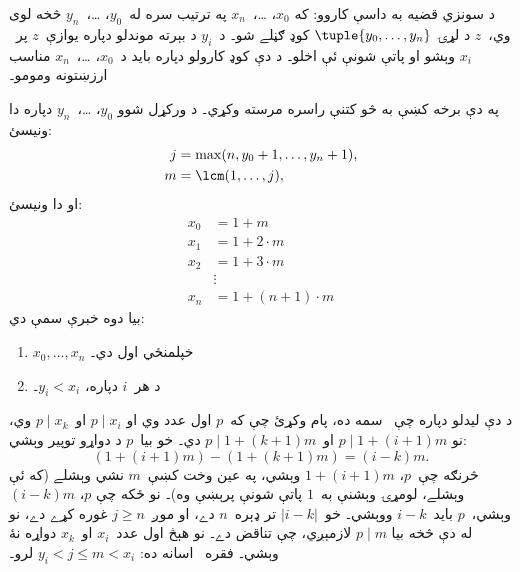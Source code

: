 \documentclass[../../../include/open-logic-section]{subfiles}
\begin{document}
د سونزي قضيه به داسې کاروو: که $x_0$، \dots،~$x_n$ په ترتيب سره
له~$y_0$، \dots،~$y_n$ څخه لوی وي،~$z$ د لړۍ
$\tuple{y_0, \dots,y_n}$ کوډ ګڼلے شو۔ د~$y_i$ د بېرته موندلو
دپاره يوازې~$z$ پر~$x_i$ وېشو او پاتې شونې ئې اخلو۔ د دې کوډ کارولو
دپاره بايد د~$x_0$، \dots،~$x_n$ مناسب ارزښتونه ومومو۔

په دې برخه کښې به څو کتنې راسره مرسته وکړي۔ د ورکړل شوو
$y_0$، \dots،~$y_n$ دپاره دا ونيسئ:
\begin{align*}
j &= \max(n, y_0 + 1, \dots, y_n + 1), \\
m &= \lcm(1,\dots,j),
\end{align*}
او دا ونيسئ:
\begin{align*}
x_0 & = 1 + m \\
x_1 & = 1 + 2 \cdot m \\
x_2 & = 1 + 3 \cdot m \\
& \vdots  \\
x_n & = 1 + (n+1) \cdot m
\end{align*}
بيا دوه خبرې سمې دي:
\begin{enumerate}
\item{} $x_0,\dots,x_n$ خپلمنځي اول دي۔
\item{} د هر~$i$ دپاره، $y_i < x_i$۔
\end{enumerate}
د دې ليدلو دپاره چې~ سمه ده، پام وکړئ چې که~$p$
اول عدد وي او $p \mid x_i$ او~$p \mid x_k$ وي، نو
$p \mid 1 + (i+1) m$ او~$p \mid 1 + (k+1) m$ دي۔ خو بيا~$p$ د
دواړو توپير وېشي:
\[
(1 + (i+1)m) - (1+ (k+1)m) = (i-k) m.
\]
څرنګه چې~$p$، $1 + (i+1)m$ وېشي، په عين وخت کښې~$m$ نشي وېشلے
(که ئې وېشلے، لومړۍ وېشنې به~$1$ پاتې شونې پرېښې وه)۔ نو ځکه چې
$p$، $(i-k)m$ وېشي،~$p$ بايد~$i-k$ ووېشي۔ خو~$\left|i-k\right|$ تر
ډېره~$n$ دے، او موږ~$j \geq n$ غوره کړے دے، نو له دې څخه بيا
$p \mid m$ لازمېږي، چې تناقض دے۔ نو هېڅ اول عدد~$x_i$ او~$x_k$
دواړه نۀ وېشي۔ فقره~ اسانه ده:
$y_i < j \leq m < x_i$ لرو۔
\end{document}
